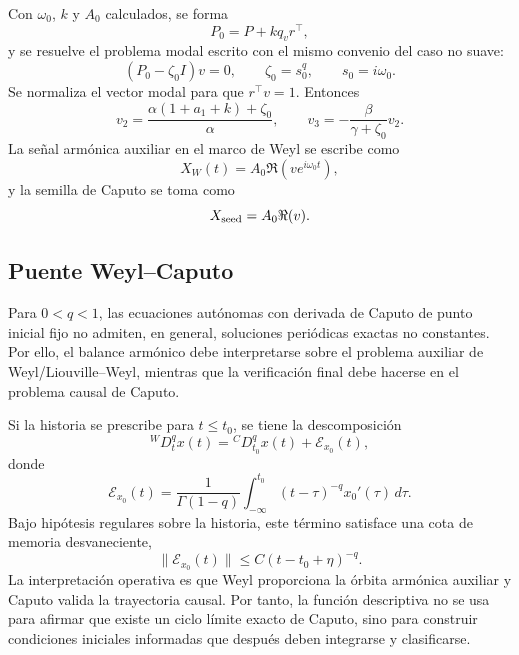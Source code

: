 \documentclass[journal]{IEEEtran}
\begin{document}
Con $\omega_0$, $k$ y $A_0$ calculados, se forma
\begin{equation}
\label{eq:P0_arctan}
P_0=P+kq_vr^\top,
\end{equation}
y se resuelve el problema modal escrito con el mismo convenio del caso no suave:
\begin{equation}
\label{eq:modal_seed_arctan}
(P_0-\zeta_0 I)v=0,
\qquad
\zeta_0=s_0^q,\qquad s_0=i\omega_0.
\end{equation}
Se normaliza el vector modal para que $r^\top v=1$. Entonces
\begin{equation}
\label{eq:v_arctan_formula}
v_2=\frac{\alpha(1+a_1+k)+\zeta_0}{\alpha},
\qquad
v_3=-\frac{\beta}{\gamma+\zeta_0}v_2.
\end{equation}
La señal armónica auxiliar en el marco de Weyl se escribe como
\begin{equation}
\label{eq:W_seed_traj_arctan}
X_W(t)=A_0\Re\left(v e^{i\omega_0t}\right),
\end{equation}
y la semilla de Caputo se toma como
\begin{equation}
\label{eq:X_seed_arctan}
X_{\rm seed}=A_0\Re(v).
\end{equation}

\subsection{Puente Weyl--Caputo}

Para $0<q<1$, las ecuaciones autónomas con derivada de Caputo de punto inicial fijo no admiten, en general, soluciones periódicas exactas no constantes. Por ello, el balance armónico debe interpretarse sobre el problema auxiliar de Weyl/Liouville--Weyl, mientras que la verificación final debe hacerse en el problema causal de Caputo.

Si la historia se prescribe para $t\le t_0$, se tiene la descomposición
\begin{equation}
\label{eq:WC_bridge_arctan}
{}^{W}D_t^q x(t)={}^{C}D_{t_0}^q x(t)+\mathcal E_{x_0}(t),
\end{equation}
donde
\begin{equation}
\label{eq:error_wc_arctan}
\mathcal E_{x_0}(t)=\frac{1}{\Gamma(1-q)}\int_{-\infty}^{t_0}(t-\tau)^{-q}x_0'(\tau)\,d\tau.
\end{equation}
Bajo hipótesis regulares sobre la historia, este término satisface una cota de memoria desvaneciente,
\begin{equation}
\label{eq:fading_memory_arctan}
\|\mathcal E_{x_0}(t)\|\le C(t-t_0+\eta)^{-q}.
\end{equation}
La interpretación operativa es que Weyl proporciona la órbita armónica auxiliar y Caputo valida la trayectoria causal. Por tanto, la función descriptiva no se usa para afirmar que existe un ciclo límite exacto de Caputo, sino para construir condiciones iniciales informadas que después deben integrarse y clasificarse.
\end{document}
